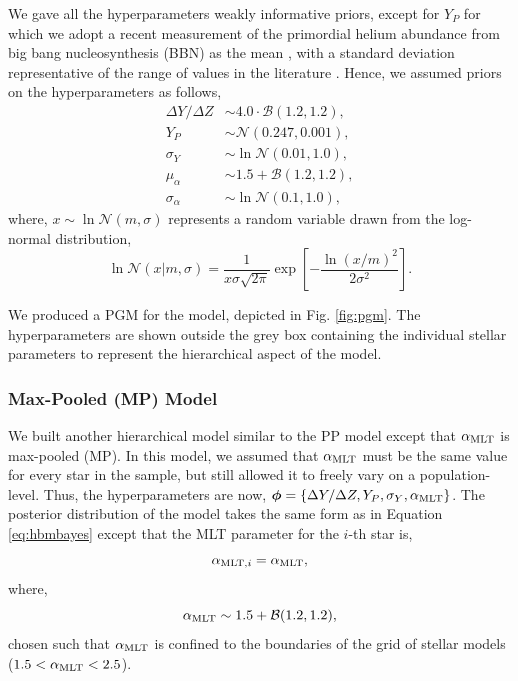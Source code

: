 We gave all the hyperparameters weakly informative priors, except for $Y_P$ for which we adopt a recent measurement of the primordial helium abundance from big bang nucleosynthesis (BBN) as the mean \citep{Pitrou.Coc.ea2018}, with a standard deviation representative of the range of values in the literature \citep{Aver.Olive.ea2015, Peimbert.Peimbert.ea2016, Cooke.Fumagalli2018}. Hence, we assumed priors on the hyperparameters as follows,
%
\begin{align*}
    {\Delta Y}/{\Delta Z} &\sim 4.0\cdot\mathcal{B}(1.2, 1.2),\\
    Y_P &\sim \mathcal{N}(0.247, 0.001),\\
    \sigma_Y &\sim \ln\mathcal{N}(0.01, 1.0),\\
    \mu_\alpha &\sim 1.5 + \mathcal{B}(1.2, 1.2),\\
    \sigma_\alpha &\sim \ln\mathcal{N}(0.1, 1.0),
\end{align*}
%
where, $x \sim \ln\mathcal{N}(m, \sigma)$ represents a random variable drawn from the log-normal distribution,
%
\begin{equation}
    \ln\mathcal{N}(x | m, \sigma)=  \frac{1}{x \sigma \sqrt{2 \pi}} \exp \left[ - \frac{\ln (x / m)^{2}}{2 \sigma^{2}}\right].
\end{equation}
%

We produced a PGM for the model, depicted in Fig. \ref{fig:pgm}. The hyperparameters are shown outside the grey box containing the individual stellar parameters to represent the hierarchical aspect of the model.

\subsubsection{Max-Pooled (MP) Model}\label{sec:mp}



We built another hierarchical model similar to the PP model except that ${\alpha_\mathrm{MLT}}$ is max-pooled (MP). In this model, we assumed that ${\alpha_\mathrm{MLT}}$ must be the same value for every star in the sample, but still allowed it to freely vary on a population-level. Thus, the hyperparameters are now, $\boldsymbol{\phi} = \{\Delta Y/\Delta Z, Y_P, \sigma_Y, {\alpha_\mathrm{MLT}}\}$. The posterior distribution of the model takes the same form as in Equation \ref{eq:hbmbayes} except that the MLT parameter for the $i$-th star is,
%
\begin{equation}
    \alpha_{\mathrm{MLT}, i} = {\alpha_\mathrm{MLT}},
\end{equation}
%
where,
\begin{equation}
    {\alpha_\mathrm{MLT}} \sim 1.5 + \mathcal{B}(1.2, 1.2),
\end{equation}
%
chosen such that ${\alpha_\mathrm{MLT}}$ is confined to the boundaries of the grid of stellar models ($1.5 < {\alpha_\mathrm{MLT}} < 2.5$).

